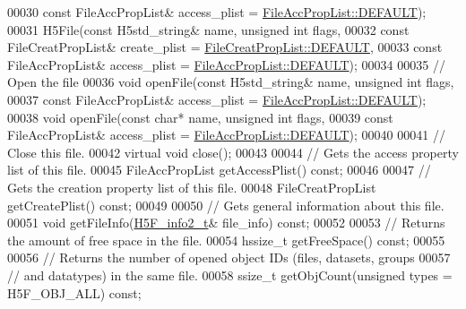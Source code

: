 \begin{DoxyCode}
00030            \textcolor{keyword}{const} FileAccPropList& access\_plist = \hyperlink{class_h5_1_1_file_acc_prop_list_a866e7c16e8840c67a194f3bef8501e48}{FileAccPropList::DEFAULT});
00031         H5File(\textcolor{keyword}{const} H5std\_string& name, \textcolor{keywordtype}{unsigned} \textcolor{keywordtype}{int} flags,
00032            \textcolor{keyword}{const} FileCreatPropList& create\_plist = \hyperlink{class_h5_1_1_file_creat_prop_list_a4913710830a8ec38fbbda805074377d4}{FileCreatPropList::DEFAULT},
00033            \textcolor{keyword}{const} FileAccPropList& access\_plist = \hyperlink{class_h5_1_1_file_acc_prop_list_a866e7c16e8840c67a194f3bef8501e48}{FileAccPropList::DEFAULT});
00034 
00035         \textcolor{comment}{// Open the file}
00036         \textcolor{keywordtype}{void} openFile(\textcolor{keyword}{const} H5std\_string& name, \textcolor{keywordtype}{unsigned} \textcolor{keywordtype}{int} flags,
00037             \textcolor{keyword}{const} FileAccPropList& access\_plist = \hyperlink{class_h5_1_1_file_acc_prop_list_a866e7c16e8840c67a194f3bef8501e48}{FileAccPropList::DEFAULT});
00038         \textcolor{keywordtype}{void} openFile(\textcolor{keyword}{const} \textcolor{keywordtype}{char}* name, \textcolor{keywordtype}{unsigned} \textcolor{keywordtype}{int} flags,
00039             \textcolor{keyword}{const} FileAccPropList& access\_plist = \hyperlink{class_h5_1_1_file_acc_prop_list_a866e7c16e8840c67a194f3bef8501e48}{FileAccPropList::DEFAULT});
00040 
00041         \textcolor{comment}{// Close this file.}
00042         \textcolor{keyword}{virtual} \textcolor{keywordtype}{void} close();
00043 
00044         \textcolor{comment}{// Gets the access property list of this file.}
00045         FileAccPropList getAccessPlist() \textcolor{keyword}{const};
00046 
00047         \textcolor{comment}{// Gets the creation property list of this file.}
00048         FileCreatPropList getCreatePlist() \textcolor{keyword}{const};
00049 
00050         \textcolor{comment}{// Gets general information about this file.}
00051         \textcolor{keywordtype}{void} getFileInfo(\hyperlink{struct_h5_f__info2__t}{H5F\_info2\_t}& file\_info) \textcolor{keyword}{const};
00052 
00053         \textcolor{comment}{// Returns the amount of free space in the file.}
00054         hssize\_t getFreeSpace() \textcolor{keyword}{const};
00055 
00056         \textcolor{comment}{// Returns the number of opened object IDs (files, datasets, groups}
00057         \textcolor{comment}{// and datatypes) in the same file.}
00058         ssize\_t getObjCount(\textcolor{keywordtype}{unsigned} types = H5F\_OBJ\_ALL) \textcolor{keyword}{const};

\end{DoxyCode}
